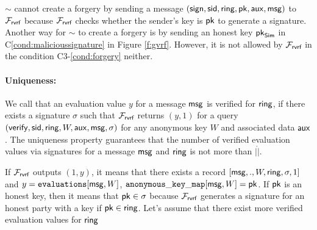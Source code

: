 	$ \sim $ cannot create a forgery by sending a message $ (\mathsf{sign}, \textsf{sid},\mathsf{ring},\mathsf{pk},\mathsf{aux},\mathsf{msg}) $ to $ \mathcal{F}_{\textsf{rvrf}} $ because $ \mathcal{F}_{\textsf{rvrf}} $ checks whether the sender's key is $ \mathsf{pk} $ to generate a signature. Another way for $ \sim $ to create a forgery is by sending an honest key $ \mathsf{pk}_{\mathsf{Sim}} $  in C\ref{cond:malicioussignature} in Figure \ref{f:gvrf}. However, it is not allowed by $ \mathcal{F}_{\textsf{rvrf}} $ in the condition C3-\ref{cond:forgery} neither.
	
	\paragraph{Uniqueness:} We call that an evaluation value $ y $ for a message $ \mathsf{msg} $  is verified for $ \mathsf{ring} $, if there exists a signature $ \sigma $ such that $ \mathcal{F}_{\textsf{rvrf}}$ returns $ (y, 1)$ for a query $ (\mathsf{verify}, \textsf{sid}, \mathsf{ring},W,\mathsf{aux},\mathsf{msg},\sigma)$ for any anonymous key $ W $ and associated data $\mathsf{aux} $. The uniqueness property guarantees that the number of verified evaluation values via signatures for a message $ \mathsf{msg} $ and $ \mathsf{ring} $ is not more than $ |\ring| $.
	
	If $ \mathcal{F}_{\textsf{rvrf}} $ outputs $ (1,y) $, it means that there exists a record $ [\mathsf{msg}, ., W,\mathsf{ring}, \sigma,1] $ and $ y = \texttt{evaluations}[\mathsf{msg}, W] $, $ \mathtt{anonymous\_key\_map}[\mathsf{msg}, W]  = \mathsf{pk}$.  If $ \mathsf{pk} $ is an honest key, then it means that $ \mathsf{pk} \in \sigma $ because $ \mathcal{F}_{\textsf{rvrf}} $ generates a signature for an honest party with a key if $ \mathsf{pk} \in \mathsf{ring} $. Let's assume that there exist more verified evaluation values for $ \mathsf{ring} $
	
